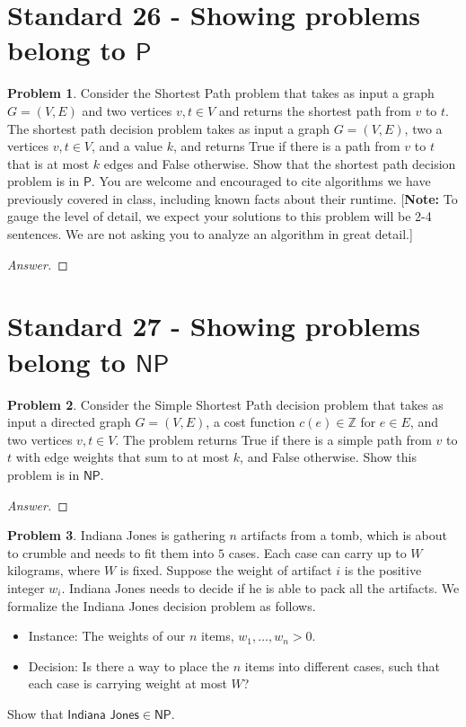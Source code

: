\documentclass[11pt]{article}
\theoremstyle{definition}
\theoremstyle{definition}
\newtheorem{required}{Problem}
\theoremstyle{definition}
\begin{document}
\newpage
\section{Standard 26 - Showing problems belong to $\textsf{P}$}
\begin{required} \label{InP}
Consider the Shortest Path problem that takes as input a graph $G=(V,E)$
and two vertices $v,t\in V$ and returns the shortest path from $v$ to $t$.
The shortest path decision problem takes as input a graph $G=(V,E)$, two a
vertices $v,t\in V$, and a value $k$, and returns True if there is a path from
$v$ to $t$ that is at most $k$ edges and False otherwise. Show that the
shortest path decision problem is in $\textsf{P}$. You are welcome and
encouraged to cite algorithms we have previously covered in class, including
known facts about their runtime.  [\textbf{Note:} To gauge the level of
detail, we expect your solutions to this problem will be 2-4 sentences. We are
not asking you to analyze an algorithm in great detail.]

\end{required}
\begin{proof}[Answer]

\end{proof}


\newpage
\section{Standard 27 - Showing problems belong to $\textsf{NP}$}
\begin{required} \label{InNP}
Consider the Simple Shortest Path decision problem that takes as input a
directed graph $G=(V,E)$, a cost function $c(e)\in \mathbb{Z}$ for $e \in E$,
and two vertices $v,t\in V$. The problem returns True if there is a simple path from
$v$ to $t$ with edge weights that sum to at most $k$, and False otherwise.
Show this problem is in $\textsf{NP}$.
\end{required}

\begin{proof}[Answer]

\end{proof}

\newpage
\begin{required} 
Indiana Jones is gathering $n$ artifacts from a tomb, which is about to crumble and needs to fit them into $5$ cases. Each case can carry up to $W$ kilograms, where $W$ is fixed. Suppose the weight of artifact $i$ is the positive integer $w_{i}$. Indiana Jones needs to decide if he is able to pack all the artifacts. We formalize the \textsf{Indiana Jones} decision problem as follows.
\begin{itemize}
\item \textsf{Instance:} The weights of our $n$ items, $w_{1}, \ldots, w_{n} > 0$. 
\item \textsf{Decision:} Is there a way to place the $n$ items into different cases, such that each case is carrying weight at most $W$?
\end{itemize}

\noindent Show that $\textsf{Indiana Jones} \in \textsf{NP}.$
\end{required}
\end{document}
